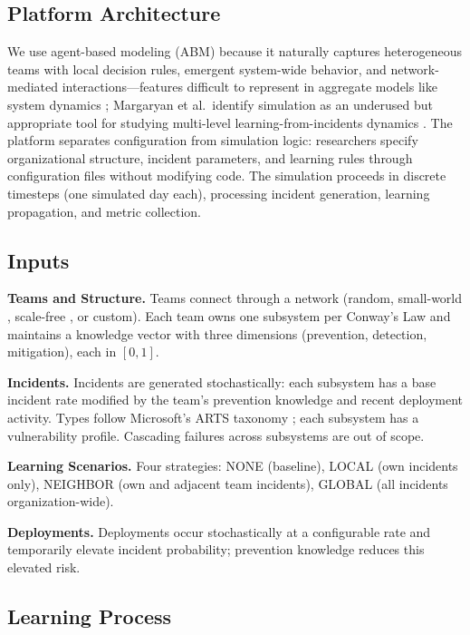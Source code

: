 \documentclass[conference,10pt]{IEEEtran}
\begin{document}
\subsection{Platform Architecture}

We use agent-based modeling (ABM) because it naturally captures heterogeneous teams with local decision rules, emergent system-wide behavior, and network-mediated interactions---features difficult to represent in aggregate models like system dynamics \cite{bonabeau2002}; Margaryan et al.\ identify simulation as an underused but appropriate tool for studying multi-level learning-from-incidents dynamics \cite{margaryan2017}. The platform separates configuration from simulation logic: researchers specify organizational structure, incident parameters, and learning rules through configuration files without modifying code. The simulation proceeds in discrete timesteps (one simulated day each), processing incident generation, learning propagation, and metric collection.

\subsection{Inputs}

\textbf{Teams and Structure.} Teams connect through a network (random, small-world \cite{watts1998}, scale-free \cite{barabasi1999}, or custom). Each team owns one subsystem per Conway's Law \cite{conway1968, maccormack2012} and maintains a knowledge vector with three dimensions (prevention, detection, mitigation), each in $[0, 1]$.

\textbf{Incidents.} Incidents are generated stochastically: each subsystem has a base incident rate modified by the team's prevention knowledge and recent deployment activity. Types follow Microsoft's ARTS taxonomy \cite{dogga2023}; each subsystem has a vulnerability profile. Cascading failures across subsystems are out of scope.

\textbf{Learning Scenarios.} Four strategies: NONE (baseline), LOCAL (own incidents only), NEIGHBOR (own and adjacent team incidents), GLOBAL (all incidents organization-wide).

\textbf{Deployments.} Deployments occur stochastically at a configurable rate and temporarily elevate incident probability; prevention knowledge reduces this elevated risk.

\subsection{Learning Process}
\end{document}
